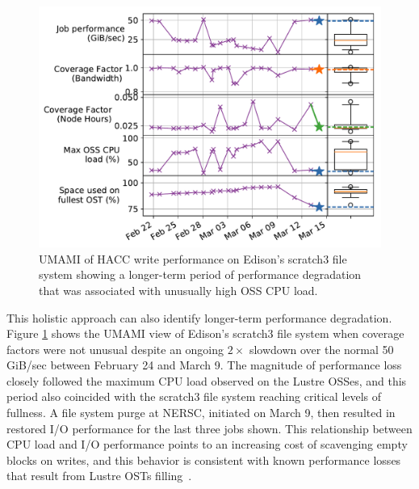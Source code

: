 \begin{figure}[t]
    \centering
    \includegraphics[width=1.0\columnwidth]{figs/umami-scratch3-hacc-write-long-term.pdf}
    \vspace{-.25in}
    \caption{UMAMI of HACC write performance on Edison's scratch3 file system showing a longer-term period of performance degradation that was associated with unusually high OSS CPU load.
    }
    \label{fig:umami-scratch3-hacc-write-long-term}
	\vspace{-.15in}
\end{figure}

This holistic approach can also identify longer-term performance degradation.
Figure \ref{fig:umami-scratch3-hacc-write-long-term} shows the UMAMI view of Edison's scratch3 file system when coverage factors were not unusual despite an ongoing $2\times$ slowdown over the normal 50 GiB/sec between February 24 and March 9.
The magnitude of performance loss closely followed the maximum CPU load observed on the Lustre OSSes, and this period also coincided with the scratch3 file system reaching critical levels of fullness.
A file system purge at NERSC, initiated on March 9, then resulted in restored I/O performance for the last three jobs shown.
This relationship between CPU load and I/O performance points to an increasing cost of scavenging empty blocks on writes, and this behavior is consistent with known performance losses that result from Lustre OSTs filling~\cite{oral2014best}.  
